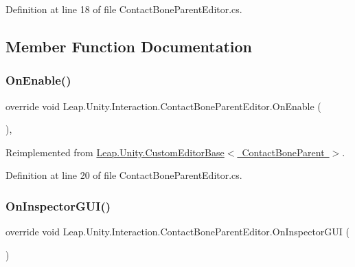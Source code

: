 Definition at line 18 of file Contact\+Bone\+Parent\+Editor.\+cs.



\subsection{Member Function Documentation}
\mbox{\label{class_leap_1_1_unity_1_1_interaction_1_1_contact_bone_parent_editor_abc5a408dfb6b991eae126a5b283f608d}} 
\subsubsection{\texorpdfstring{OnEnable()}{OnEnable()}}
{\footnotesize\ttfamily override void Leap.\+Unity.\+Interaction.\+Contact\+Bone\+Parent\+Editor.\+On\+Enable (\begin{DoxyParamCaption}{ }\end{DoxyParamCaption})\hspace{0.3cm}{\ttfamily [protected]}, {\ttfamily [virtual]}}



Reimplemented from \mbox{\hyperlink{class_leap_1_1_unity_1_1_custom_editor_base_a2268bc01655342bd3da5ae015bfa2f93}{Leap.\+Unity.\+Custom\+Editor\+Base$<$ Contact\+Bone\+Parent $>$}}.



Definition at line 20 of file Contact\+Bone\+Parent\+Editor.\+cs.

\mbox{\label{class_leap_1_1_unity_1_1_interaction_1_1_contact_bone_parent_editor_ab77bcfdec8c5517bb0266a310a26a1af}} 
\subsubsection{\texorpdfstring{OnInspectorGUI()}{OnInspectorGUI()}}
{\footnotesize\ttfamily override void Leap.\+Unity.\+Interaction.\+Contact\+Bone\+Parent\+Editor.\+On\+Inspector\+G\+UI (\begin{DoxyParamCaption}{ }\end{DoxyParamCaption})}




